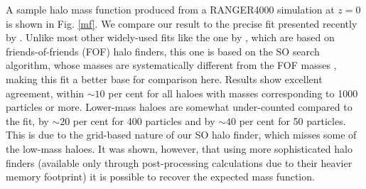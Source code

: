 A sample halo mass function produced  from a RANGER4000 simulation at $z=0$ is shown in Fig. \ref{mf}. We compare our result to the 
precise fit presented recently by \citet{2008ApJ...688..709T}. Unlike most
other widely-used fits like the one by \citet{2002MNRAS.329...61S}, which are based on friends-of-friends (FOF)
halo finders, this one is based on the
SO search algorithm, whose masses are systematically different 
from the FOF masses \citep[e.g.][]{2007MNRAS.374....2R,2008ApJ...688..709T}, 
making this fit a better base for comparison here. Results show excellent
agreement, within $\sim10$ per cent for all haloes with masses corresponding to
1000 particles or more. Lower-mass haloes are somewhat under-counted compared
to the \citet{2008ApJ...688..709T} fit, by $\sim20$ per cent for 400 particles and 
by $\sim40$ per cent for 50 particles. This is due to the grid-based nature of our
SO halo finder, which misses some of the low-mass haloes. It was shown, however, that using more sophisticated
halo finders (available only through post-processing calculations due to their heavier memory
footprint) it is possible to recover the expected mass function.

%


